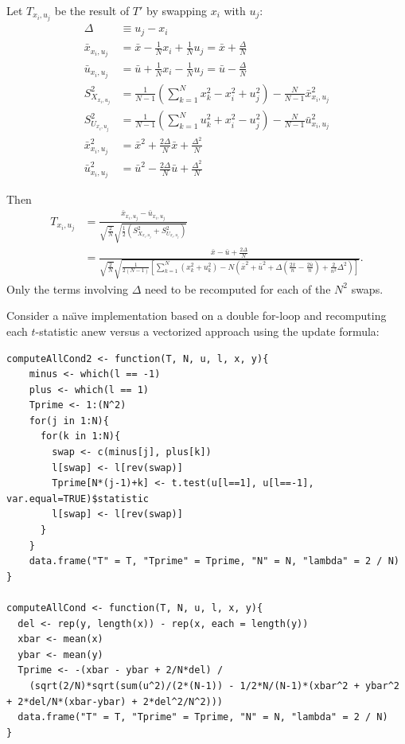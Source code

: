 Let $T_{x_i,u_j}$ be the result of $T'$ by swapping $x_i$ with $u_j$:
\begin{align*}
  \Delta &\equiv u_j-x_i \\
  \bar{x}_{x_i,u_j} &= \bar{x}-\frac{1}{N}x_i+\frac{1}{N}u_j =
  \bar{x}+\frac{\Delta}{N} \\
  \bar{u}_{x_i,u_j} &= \bar{u}+\frac{1}{N}x_i-\frac{1}{N}u_j =
  \bar{u}-\frac{\Delta}{N} \\
  S_{X_{x_i,u_j}}^2 &= \frac{1}{N-1}(\sum_{k=1}^N x_k^2 - x_i^2 +
  u_j^2) - \frac{N}{N-1}\bar{x}^2_{x_i,u_j} \\
  S_{U_{x_i,u_j}}^2 &= \frac{1}{N-1}(\sum_{k=1}^N u_k^2 + x_i^2 -
  u_j^2) - \frac{N}{N-1}\bar{u}^2_{x_i,u_j} \\
  \bar{x}_{x_i,u_j}^2 &= \bar{x}^2 + \frac{2\Delta}{N}\bar{x} +
  \frac{\Delta^2}{N} \\
  \bar{u}_{x_i,u_j}^2 &= \bar{u}^2 - \frac{2\Delta}{N}\bar{u} + \frac{\Delta^2}{N}
\end{align*}

Then
\begin{align*}
  T_{x_i,u_j} &= \frac{\bar{x}_{x_i,u_j}-\bar{u}_{x_i,u_j}}
  {\sqrt{\frac{2}{N}}\sqrt{\frac{1}{2}(S_{X_{x_i,u_j}}^2+S_{U_{x_i,u_j}}^2)}}\\
  &= \frac{\bar{x}-\bar{u}+\frac{2\Delta}{N}}
  {\sqrt{\frac{2}{N}}\sqrt{\frac{1}{2(N-1)}[\sum_{k=1}^N (x_k^2+u_k^2)
      -N(\bar{x}^2+\bar{u}^2+\Delta(\frac{2\bar{x}}{n}
      -\frac{2\bar{u}}{n})+\frac{2}{n^2}\Delta^2)]}}.
\end{align*}
Only the terms involving $\Delta$ need to be recomputed for each of the $N^2$ swaps.

Consider a na\"{\i}ve implementation based on a double for-loop and recomputing each $t$-statistic
anew versus a vectorized approach using the update formula:
\begin{verbatim}
computeAllCond2 <- function(T, N, u, l, x, y){
    minus <- which(l == -1)
    plus <- which(l == 1)
    Tprime <- 1:(N^2)
    for(j in 1:N){
      for(k in 1:N){
        swap <- c(minus[j], plus[k])
        l[swap] <- l[rev(swap)]
        Tprime[N*(j-1)+k] <- t.test(u[l==1], u[l==-1], var.equal=TRUE)$statistic
        l[swap] <- l[rev(swap)]
      }
    }
    data.frame("T" = T, "Tprime" = Tprime, "N" = N, "lambda" = 2 / N)
}

computeAllCond <- function(T, N, u, l, x, y){
  del <- rep(y, length(x)) - rep(x, each = length(y))
  xbar <- mean(x)
  ybar <- mean(y)
  Tprime <- -(xbar - ybar + 2/N*del) /
    (sqrt(2/N)*sqrt(sum(u^2)/(2*(N-1)) - 1/2*N/(N-1)*(xbar^2 + ybar^2 + 2*del/N*(xbar-ybar) + 2*del^2/N^2)))
  data.frame("T" = T, "Tprime" = Tprime, "N" = N, "lambda" = 2 / N)
}
\end{verbatim}

